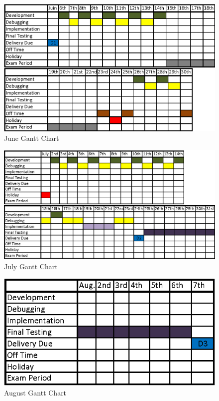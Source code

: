 \documentclass[12pt]{article}
\begin{document}
\begin{figure}[h!]
    \centering
    \includegraphics[scale=0.5]{Gantt_june}
    \caption{June Gantt Chart}
    \label{fig:JuneGanttChart}
\end{figure}
\begin{figure}[h!]
    \centering
    \includegraphics[scale=0.5]{Gantt_july}
    \caption{July Gantt Chart}
    \label{fig:JulyGanttChart}
\end{figure}
\begin{figure}[h!]
    \centering
    \includegraphics[scale=0.8]{Gantt_august}
    \caption{August Gantt Chart}
    \label{fig:AugustGanttChart}
\end{figure}
\end{document}
